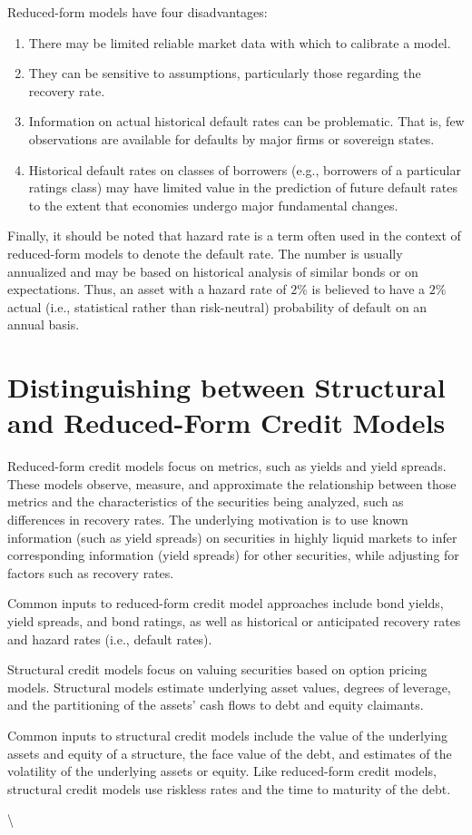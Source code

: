 \documentclass[11pt]{article}
\begin{document}
Reduced-form models have four disadvantages:

\begin{enumerate}
  \item There may be limited reliable market data with which to calibrate a model.

  \item They can be sensitive to assumptions, particularly those regarding the recovery rate.

  \item Information on actual historical default rates can be problematic. That is, few observations are available for defaults by major firms or sovereign states.

  \item Historical default rates on classes of borrowers (e.g., borrowers of a particular ratings class) may have limited value in the prediction of future default rates to the extent that economies undergo major fundamental changes.

\end{enumerate}

Finally, it should be noted that hazard rate is a term often used in the context of reduced-form models to denote the default rate. The number is usually annualized and may be based on historical analysis of similar bonds or on expectations. Thus, an asset with a hazard rate of $2 \%$ is believed to have a $2 \%$ actual (i.e., statistical rather than risk-neutral) probability of default on an annual basis.

\section*{Distinguishing between Structural and Reduced-Form Credit Models}
Reduced-form credit models focus on metrics, such as yields and yield spreads. These models observe, measure, and approximate the relationship between those metrics and the characteristics of the securities being analyzed, such as differences in recovery rates. The underlying motivation is to use known information (such as yield spreads) on securities in highly liquid markets to infer corresponding information (yield spreads) for other securities, while adjusting for factors such as recovery rates.

Common inputs to reduced-form credit model approaches include bond yields, yield spreads, and bond ratings, as well as historical or anticipated recovery rates and hazard rates (i.e., default rates).

Structural credit models focus on valuing securities based on option pricing models. Structural models estimate underlying asset values, degrees of leverage, and the partitioning of the assets' cash flows to debt and equity claimants.

Common inputs to structural credit models include the value of the underlying assets and equity of a structure, the face value of the debt, and estimates of the volatility of the underlying assets or equity. Like reduced-form credit models, structural credit models use riskless rates and the time to maturity of the debt.

\textbackslash 
\end{document}
